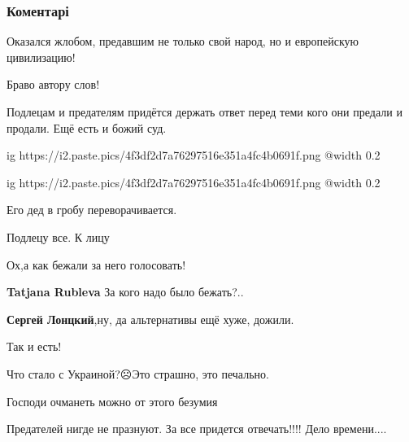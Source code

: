  
 
 
 
 
\subsubsection{Коментарі}
\label{sec:01_12_2021.fb.zhuravko_aleksej.2.zelenskii_prodal.cmt}

\begin{itemize} %
Оказался жлобом, предавшим не только свой народ, но и европейскую цивилизацию!

Браво автору слов!

Подлецам и предателям придётся держать ответ перед теми кого они предали и продали. Ещё есть и божий суд.


\ifcmt
  ig https://i2.paste.pics/4f3df2d7a76297516e351a4fc4b0691f.png
  @width 0.2
\fi


\ifcmt
  ig https://i2.paste.pics/4f3df2d7a76297516e351a4fc4b0691f.png
  @width 0.2
\fi

Его дед в гробу переворачивается.

Подлецу все. К лицу

Ох,а как бежали за него голосовать!

\begin{itemize} %
\textbf{Tatjana Rubleva} За кого надо было бежать?..

\textbf{Сергей Лонцкий},ну, да альтернативы ещё хуже, дожили.
\end{itemize} %

Так и есть!

Что стало с Украиной?☹️Это страшно, это печально.

Господи очманеть можно от этого безумия

Предателей нигде не празнуют. За все придется отвечать!!!! Дело времени....


\end{itemize}
